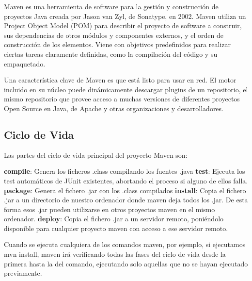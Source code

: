 \documentclass[12pt]{report}
\begin{document}
Maven es una herramienta de software para la gesti\'on y construcci\'on de proyectos Java creada por Jason van Zyl, de Sonatype, en 2002.
Maven utiliza un Project Object Model (POM) para describir el proyecto de software a construir, sus dependencias de otros m\'odulos y componentes externos, y el orden de construcci\'on de los elementos. Viene con objetivos predefinidos para realizar ciertas tareas claramente definidas, como la compilaci\'on del c\'odigo y su empaquetado.

Una caracter\'istica clave de Maven es que est\'a listo para usar en red. El motor incluido en su n\'ucleo puede din\'amicamente descargar plugins de un repositorio, el mismo repositorio que provee acceso a muchas versiones de diferentes proyectos Open Source en Java, de Apache y otras organizaciones y desarrolladores.

\subsection*{Ciclo de Vida}

Las partes del ciclo de vida principal del proyecto Maven son:

    {\bf compile}: Genera los ficheros .class compilando los fuentes .java
    {\bf test}: Ejecuta los test autom\'aticos de JUnit existentes, abortando el proceso si alguno de ellos falla.
    {\bf package}: Genera el fichero .jar con los .class compilados
    {\bf install}: Copia el fichero .jar a un directorio de nuestro ordenador donde maven deja todos los .jar. De esta forma esos .jar pueden utilizarse en otros proyectos maven en el mismo ordenador.
    {\bf deploy}: Copia el fichero .jar a un servidor remoto, poni\'endolo disponible para cualquier proyecto maven con acceso a ese servidor remoto.

Cuando se ejecuta cualquiera de los comandos maven, por ejemplo, si ejecutamos mvn install, maven ir\'a verificando todas las fases del ciclo de vida desde la primera hasta la del comando, ejecutando solo aquellas que no se hayan ejecutado previamente.
\end{document}
